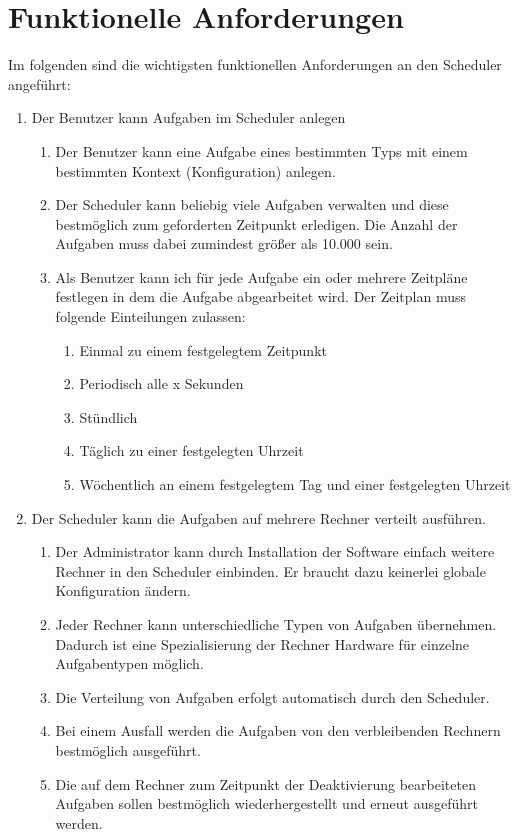 \section{Funktionelle Anforderungen}
Im folgenden sind die wichtigsten funktionellen Anforderungen an den Scheduler angeführt:
\begin{enumerate}
	\item Der Benutzer kann Aufgaben im Scheduler anlegen
	\begin{enumerate}
		\item Der Benutzer kann eine Aufgabe eines bestimmten Typs mit einem bestimmten Kontext (Konfiguration) anlegen.
		\item Der Scheduler kann beliebig viele Aufgaben verwalten und diese bestmöglich zum geforderten Zeitpunkt erledigen. Die Anzahl der Aufgaben muss dabei zumindest größer als 10.000 sein.
		\item Als Benutzer kann ich für jede Aufgabe ein oder mehrere Zeitpläne festlegen in dem die Aufgabe abgearbeitet wird. Der Zeitplan muss folgende Einteilungen zulassen:
		\begin{enumerate}
			\item Einmal zu einem festgelegtem Zeitpunkt
			\item Periodisch alle x Sekunden
			\item Stündlich
			\item Täglich zu einer festgelegten Uhrzeit
			\item Wöchentlich an einem festgelegtem Tag und einer festgelegten Uhrzeit
		\end{enumerate}
	\end{enumerate}
	\item Der Scheduler kann die Aufgaben auf mehrere Rechner verteilt ausführen.
	\begin{enumerate}
		\item Der Administrator kann durch Installation der Software einfach weitere Rechner in den Scheduler einbinden. Er braucht dazu keinerlei globale Konfiguration ändern.
		\item Jeder Rechner kann unterschiedliche Typen von Aufgaben übernehmen. Dadurch ist eine Spezialisierung der Rechner Hardware für einzelne Aufgabentypen möglich.
		\item Die Verteilung von Aufgaben erfolgt automatisch durch den Scheduler.
		\item Bei einem Ausfall werden die Aufgaben von den verbleibenden Rechnern bestmöglich ausgeführt.
		\item Die auf dem Rechner zum Zeitpunkt der Deaktivierung bearbeiteten Aufgaben sollen bestmöglich wiederhergestellt und erneut ausgeführt werden.

\end{enumerate}
\end{enumerate}
